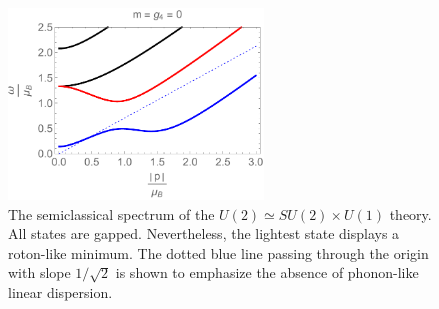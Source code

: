   \begin{figure}[h]
\begin{center}
\includegraphics[height=2.0in]{Chapter_3_Folder_1806.06976/figures/u2.pdf}
\end{center}
      \caption[This figure shows the semiclassical spectrum of the $U(2)\simeq SU(2)\times U(1)$ theory.]{ \small{The semiclassical spectrum of the $U(2)\simeq SU(2)\times U(1)$ theory. All states are gapped. Nevertheless, the lightest state displays a roton-like minimum. The dotted blue line passing through the origin with slope $1/\sqrt 2$ is shown to emphasize the absence of  phonon-like linear dispersion.}}
\label{u2}
\end{figure}

 
